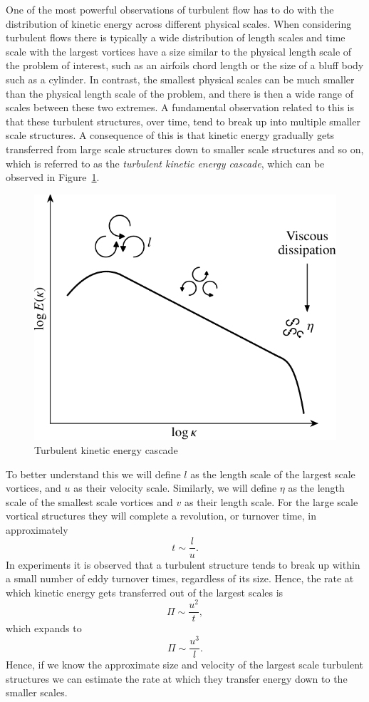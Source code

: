One of the most powerful observations of turbulent flow has to do with the distribution of kinetic energy across different physical scales. When considering turbulent flows there is typically a wide distribution of length scales and time scale with the largest vortices have a size similar to the physical length scale of the problem of interest, such as an airfoils chord length or the size of a bluff body such as a cylinder. In contrast, the smallest physical scales can be much smaller than the physical length scale of the problem, and there is then a wide range of scales between these two extremes. A fundamental observation related to this is that these turbulent structures, over time, tend to break up into multiple smaller scale structures. A consequence of this is that kinetic energy gradually gets transferred from large scale structures down to smaller scale structures and so on, which is referred to as the {\it turbulent kinetic energy cascade}, which can be observed in Figure~\ref{fig:energy_cascade}.
\begin{figure}[htbp]
	\centering
	\includegraphics[width=0.5\linewidth]{Pictures/ch7_energy_cascade}
	\caption{Turbulent kinetic energy cascade}
	\label{fig:energy_cascade}
\end{figure}

To better understand this we will define $l$ as the length scale of the largest scale vortices, and $u$ as their velocity scale. Similarly, we will define $\eta$ as the length scale of the smallest scale vortices and $v$ as their length scale. For the large scale vortical structures they will complete a revolution, or turnover time, in approximately
\begin{equation}
	t \sim \frac{l}{u}.
\end{equation}
In experiments it is observed that a turbulent structure tends to break up within a small number of eddy turnover times, regardless of its size. Hence, the rate at which kinetic energy gets transferred out of the largest scales is
\begin{equation}
	\Pi \sim \frac{u^2}{t},
\end{equation}
which expands to 
\begin{equation}
	\Pi \sim \frac{u^3}{l}.
\end{equation}
Hence, if we know the approximate size and velocity of the largest scale turbulent structures we can estimate the rate at which they transfer energy down to the smaller scales.

